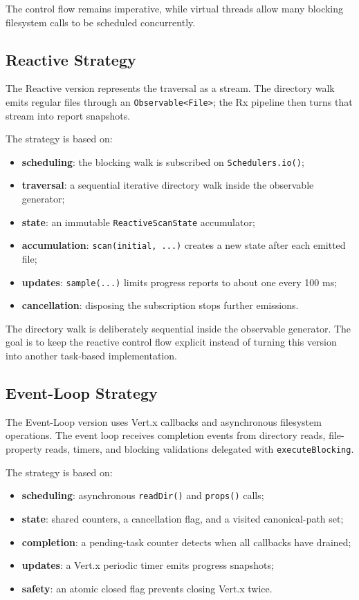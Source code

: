The control flow remains imperative, while virtual threads allow many blocking
filesystem calls to be scheduled concurrently.

\subsection{Reactive Strategy}

The Reactive version represents the traversal as a stream. The directory walk
emits regular files through an \texttt{Observable<File>}; the Rx pipeline then
turns that stream into report snapshots.

The strategy is based on:

\begin{itemize}
  \item \textbf{scheduling}: the blocking walk is subscribed on
  \texttt{Schedulers.io()};
  \item \textbf{traversal}: a sequential iterative directory walk inside the
  observable generator;
  \item \textbf{state}: an immutable \texttt{ReactiveScanState} accumulator;
  \item \textbf{accumulation}: \texttt{scan(initial, ...)} creates a new state
  after each emitted file;
  \item \textbf{updates}: \texttt{sample(...)} limits progress reports to about
  one every 100 ms;
  \item \textbf{cancellation}: disposing the subscription stops further
  emissions.
\end{itemize}

The directory walk is deliberately sequential inside the observable generator.
The goal is to keep the reactive control flow explicit instead of turning this
version into another task-based implementation.

\subsection{Event-Loop Strategy}

The Event-Loop version uses Vert.x callbacks and asynchronous filesystem
operations. The event loop receives completion events from directory reads,
file-property reads, timers, and blocking validations delegated with
\texttt{executeBlocking}.

The strategy is based on:

\begin{itemize}
  \item \textbf{scheduling}: asynchronous \texttt{readDir()} and
  \texttt{props()} calls;
  \item \textbf{state}: shared counters, a cancellation flag, and a visited
  canonical-path set;
  \item \textbf{completion}: a pending-task counter detects when all callbacks
  have drained;
  \item \textbf{updates}: a Vert.x periodic timer emits progress snapshots;
  \item \textbf{safety}: an atomic closed flag prevents closing Vert.x twice.
\end{itemize}

